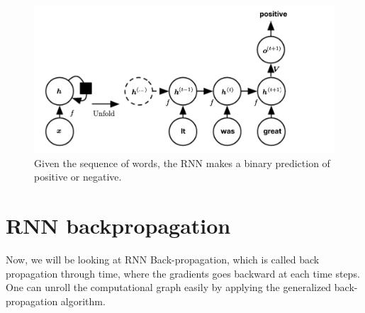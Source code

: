 \begin{figure}[H]
    \centering
    \includegraphics[scale=0.25]{images/Chapter12/sentiment_analysis.png}
    \caption{Given the sequence of words, the RNN makes a binary prediction of positive or negative.}
    \label{fig-rnn}
\end{figure}


\section{RNN backpropagation}
Now, we will be looking at RNN Back-propagation, which is called back propagation through time, where the gradients goes backward at each time steps. One can unroll the computational graph easily by applying the generalized back-propagation algorithm.

